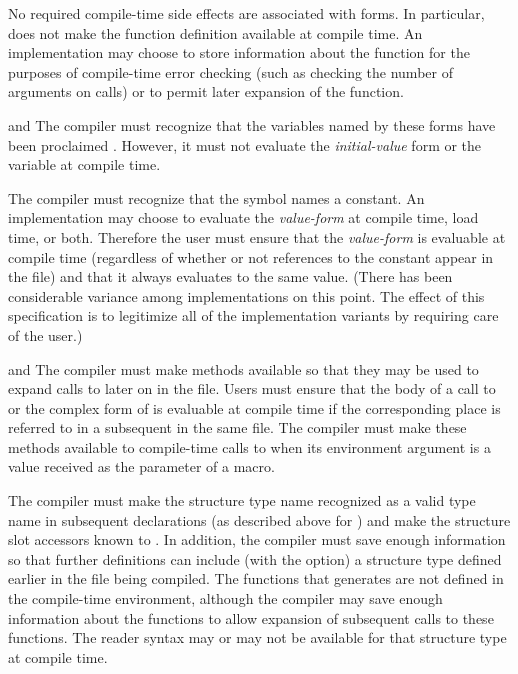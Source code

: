 \begin{newer}
\begin{flushdesc}
\item[\cd{defun}]
No required compile-time side effects are associated with  forms.
    In particular,  does not make the function definition available
    at compile time.  An implementation may choose to store information
    about the function for the purposes of compile-time error checking
    (such as checking the number of arguments on calls) or to permit later
     expansion of the function.

\item[\cd{defvar} and \cd{defparameter}]
The compiler must recognize that the variables
    named by these forms have been proclaimed .  However, it must
    not evaluate the {\it initial-value} form or  the variable at compile
    time.

\item[\cd{defconstant}]
The compiler must recognize that the symbol names a
    constant.  An implementation may choose to evaluate the {\it value-form} at
    compile time, load time, or both.  Therefore the user must ensure that
    the {\it value-form} is evaluable at compile time (regardless of whether or
    not references to the constant appear in the file) and that it always
    evaluates to the same value.  
    (There has been considerable
variance among implementations on this point.  The effect of this specification is
to legitimize all of the implementation variants by requiring care of the user.)

\item[\cd{defsetf} and \cd{define-setf-method}]
The compiler must make  methods
    available so that they may be used to expand calls to  later on in
    the file.  Users must ensure that the body of a call
    to  or
    the complex form of  is evaluable at compile time if the
    corresponding place is referred to in a subsequent  in the same
    file.  The compiler must make these  methods available to 
    compile-time calls to  when its environment argument is
    a value received as the  parameter of a macro.
     
\item[\cd{defstruct}]
The compiler must make the structure type name recognized
    as a valid type name in subsequent declarations (as described above
    for ) and
    make the structure slot accessors known to .
    In addition, the
    compiler must save enough information so that
    further  definitions can include (with the 
    option) a structure type defined
    earlier in the file being compiled.  The functions that 
    generates are not defined in the compile-time environment, although
    the compiler may save enough information about the functions to allow
     expansion of
    subsequent calls to these functions.  The  reader syntax may or may not be 
    available for that structure type at compile time.


\end{flushdesc}
\end{newer}
